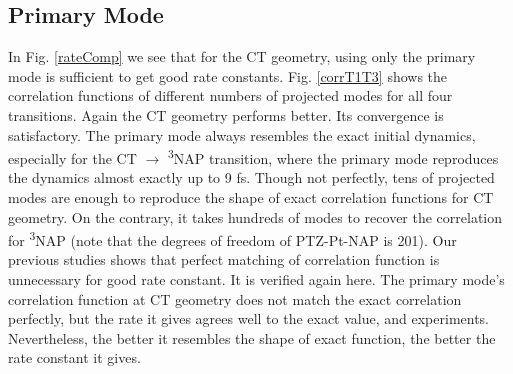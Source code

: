 \subsection{Primary Mode}

In Fig. \ref{rateComp} we see that for the CT geometry, using only the primary mode is sufficient to get good rate constants. Fig. \ref{corrT1T3} shows the correlation functions of different numbers of projected modes for all four transitions. Again the CT geometry performs better. Its convergence is satisfactory. The primary mode always resembles the exact initial dynamics, especially for the CT $\rightarrow$ \textsuperscript{3}NAP transition, where the primary mode reproduces the dynamics almost exactly up to 9 fs. Though not perfectly, tens of projected modes are enough to reproduce the shape of exact correlation functions for CT geometry. On the contrary, it takes hundreds of modes to recover the correlation for \textsuperscript{3}NAP (note that the degrees of freedom of PTZ-Pt-NAP is 201). Our previous studies \cite{yang2014intramolecular} shows that perfect matching of correlation function is unnecessary for good rate constant. It is verified again here. The primary mode's correlation function at CT geometry does not match the exact correlation perfectly, but the rate it gives agrees well to the exact value, and experiments. Nevertheless, the better it resembles the shape of exact function, the better the rate constant it gives.


